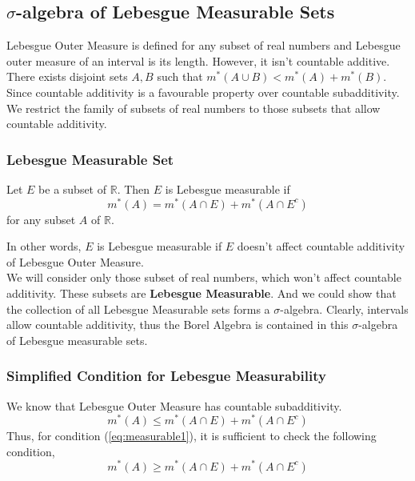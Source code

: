 \subsection{$\sigma$-algebra of Lebesgue Measurable Sets}
	Lebesgue Outer Measure is defined for any subset of real numbers and Lebesgue outer measure of an interval is its length.
	However, it isn't countable additive.\\

	There exists disjoint sets $A,B$ such that $m^\ast(A\cup B) < m^\ast(A)+m^\ast(B)$.\\
	
	Since countable additivity is a favourable property over countable subadditivity.
	We restrict the family of subsets of real numbers to those subsets that allow countable additivity.
	
\subsubsection{Lebesgue Measurable Set}
\begin{definition}
	Let $E$ be a subset of $\mathbb{R}$.
	Then $E$ is Lebesgue measurable if
\begin{equation}
	m^\ast(A) = m^\ast(A \cap E) + m^\ast(A \cap E^c)
	\label{eq:measurable1}
\end{equation}
	for any subset $A$ of $\mathbb{R}$.
\end{definition}

	In other words, $E$ is Lebesgue measurable if $E$ doesn't affect countable additivity of Lebesgue Outer Measure.\\

	We will consider only those subset of real numbers, which won't affect countable additivity.
	These subsets are \textbf{Lebesgue Measurable}.
	And we could show that the collection of all Lebesgue Measurable sets forms a $\sigma$-algebra.
	Clearly, intervals allow countable additivity, thus the Borel Algebra is contained in this $\sigma$-algebra of Lebesgue measurable sets.

\subsubsection{Simplified Condition for Lebesgue Measurability}

	We know that Lebesgue Outer Measure has countable subadditivity.
	\begin{equation*}
		m^\ast(A) \le m^\ast(A \cap E) + m^\ast(A \cap E^c)
	\end{equation*}
	Thus, for condition (\ref{eq:measurable1}), it is sufficient to check the following condition,
	\begin{equation}
		m^\ast(A) \ge m^\ast(A \cap E) + m^\ast(A \cap E^c)
		\label{eq:measurable2}
	\end{equation}

